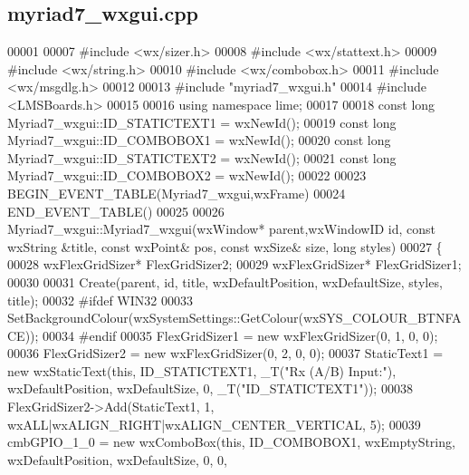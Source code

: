 \subsection{myriad7\+\_\+wxgui.\+cpp}
\label{myriad7__wxgui_8cpp_source}

\begin{DoxyCode}
00001 
00007 \textcolor{preprocessor}{#include <wx/sizer.h>}
00008 \textcolor{preprocessor}{#include <wx/stattext.h>}
00009 \textcolor{preprocessor}{#include <wx/string.h>}
00010 \textcolor{preprocessor}{#include <wx/combobox.h>}
00011 \textcolor{preprocessor}{#include <wx/msgdlg.h>}
00012 
00013 \textcolor{preprocessor}{#include "myriad7_wxgui.h"}
00014 \textcolor{preprocessor}{#include <LMSBoards.h>}
00015 
00016 \textcolor{keyword}{using namespace }lime;
00017 
00018 \textcolor{keyword}{const} \textcolor{keywordtype}{long} Myriad7_wxgui::ID_STATICTEXT1 = wxNewId();
00019 \textcolor{keyword}{const} \textcolor{keywordtype}{long} Myriad7_wxgui::ID_COMBOBOX1 = wxNewId();
00020 \textcolor{keyword}{const} \textcolor{keywordtype}{long} Myriad7_wxgui::ID_STATICTEXT2 = wxNewId();
00021 \textcolor{keyword}{const} \textcolor{keywordtype}{long} Myriad7_wxgui::ID_COMBOBOX2 = wxNewId();
00022 
00023 BEGIN\_EVENT\_TABLE(Myriad7_wxgui,wxFrame)
00024 END\_EVENT\_TABLE()
00025 
00026 Myriad7_wxgui::Myriad7_wxgui(wxWindow* parent,wxWindowID \textcolor{keywordtype}{id}, const wxString &title, const wxPoint& pos,
      const wxSize& size, \textcolor{keywordtype}{long} styles)
00027 \{
00028     wxFlexGridSizer* FlexGridSizer2;
00029     wxFlexGridSizer* FlexGridSizer1;
00030 
00031     Create(parent, \textcolor{keywordtype}{id}, title, wxDefaultPosition, wxDefaultSize, styles, title);
00032 \textcolor{preprocessor}{#ifdef WIN32}
00033     SetBackgroundColour(wxSystemSettings::GetColour(wxSYS\_COLOUR\_BTNFACE));
00034 \textcolor{preprocessor}{#endif}
00035     FlexGridSizer1 = \textcolor{keyword}{new} wxFlexGridSizer(0, 1, 0, 0);
00036     FlexGridSizer2 = \textcolor{keyword}{new} wxFlexGridSizer(0, 2, 0, 0);
00037     StaticText1 = \textcolor{keyword}{new} wxStaticText(\textcolor{keyword}{this}, ID\_STATICTEXT1, _T(\textcolor{stringliteral}{"Rx (A/B) Input:"}), wxDefaultPosition, 
      wxDefaultSize, 0, _T(\textcolor{stringliteral}{"ID\_STATICTEXT1"}));
00038     FlexGridSizer2->Add(StaticText1, 1, wxALL|wxALIGN\_RIGHT|wxALIGN\_CENTER\_VERTICAL, 5);
00039     cmbGPIO\_1\_0 = \textcolor{keyword}{new} wxComboBox(\textcolor{keyword}{this}, ID\_COMBOBOX1, wxEmptyString, wxDefaultPosition, wxDefaultSize, 0, 0,

\end{DoxyCode}
